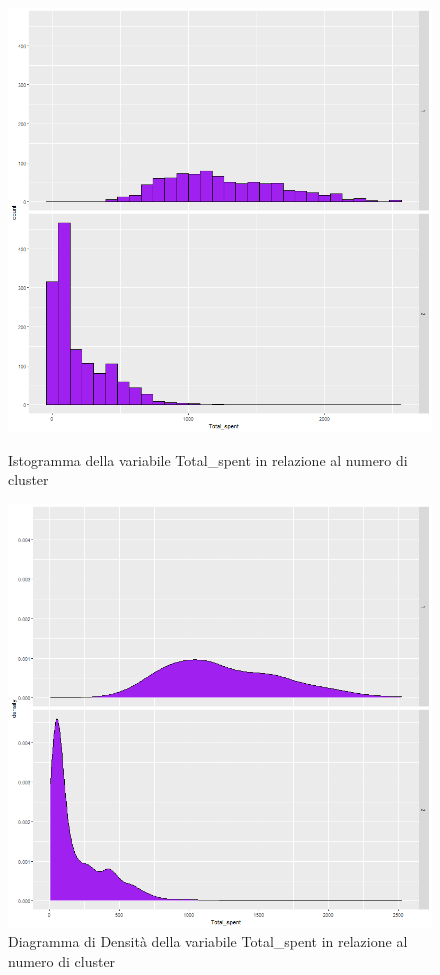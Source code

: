 \documentclass[letterpaper,11pt]{article}
\begin{document}
\begin{figure}[H]
   \begin{minipage}{0.48\textwidth}
     \centering
         \includegraphics[width=1\textwidth]{Img/K-MEANS/KMEANS013.png}
    \caption{Istogramma della variabile Total\_spent in relazione al numero di cluster}
    \label{fig:TotalSpentKmeansHistogram}
   \end{minipage}\hfill
   \begin{minipage}{0.48\textwidth}
     \centering
     \includegraphics[width=1\linewidth]{Img/K-MEANS/KMEANS014.png}
     \caption{Diagramma di Densità della variabile Total\_spent in relazione al numero di cluster}\label{fig:TotalSpentKmeansDensity}
   \end{minipage}
\end{figure}
\end{document}
